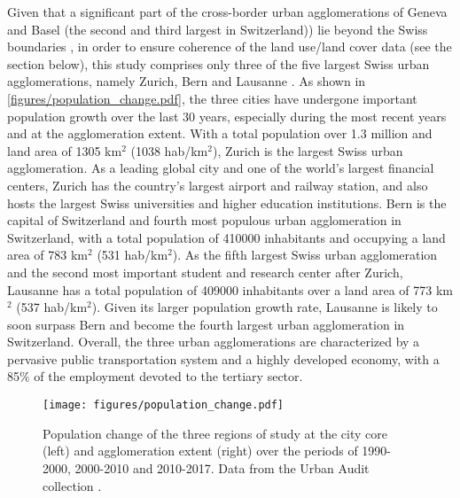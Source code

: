 \documentclass[10pt,letterpaper]{article}
\begin{document}
Given that a significant part of the cross-border urban agglomerations of Geneva and Basel (the second and third largest in Switzerland)) lie beyond the Swiss boundaries \cite{sfso2014espace}, in order to ensure coherence of the land use/land cover data (see the section below), this study comprises only three of the five largest Swiss urban agglomerations, namely Zurich, Bern and Lausanne \cite{sfso2018city}.
As shown in \autoref{figures/population_change.pdf}, the three cities have undergone important population growth over the last 30 years, especially during the most recent years and at the agglomeration extent.
With a total population over 1.3 million and land area of 1305 km$^2$ (1038 hab/km$^2$), Zurich is the largest Swiss urban agglomeration. As a leading global city and one of the world's largest financial centers, Zurich has the country's largest airport and railway station, and also hosts the largest Swiss universities and higher education institutions. 
Bern is the capital of Switzerland and fourth most populous urban agglomeration in Switzerland, with a total population of 410000 inhabitants and occupying a land area of 783 km$^2$ (531 hab/km$^2$). As the fifth largest Swiss urban agglomeration and the second most important student and research center after Zurich, Lausanne has a total population of 409000 inhabitants over a land area of 773 km$^2$ (537 hab/km$^2$). Given its larger population growth rate, Lausanne is likely to soon surpass Bern and become the fourth largest urban agglomeration in Switzerland.
Overall, the three urban agglomerations are characterized by a pervasive public transportation system and a highly developed economy, with a 85\% of the employment devoted to the tertiary sector.

\begin{figure}[!ht]
    \centering  
    \texttt{[image: figures/population\_change.pdf]}
    \vspace{.5em}
    \caption[Population change]{\label{figures/population_change.pdf}Population change of the three regions of study at the city core (left) and agglomeration extent (right) over the periods of 1990-2000, 2000-2010 and 2010-2017. Data from the Urban Audit collection \cite{sfso2018city}.}
\end{figure}
\end{document}
